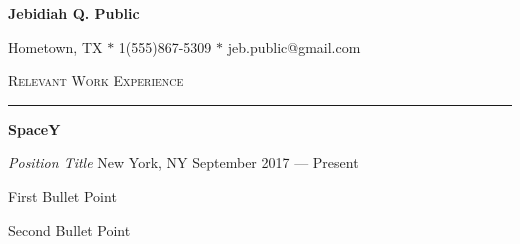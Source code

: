 \documentclass[letterpaper]{article}
\begin{document}

\begin{centering}

	{\huge\textbf{Jebidiah Q. Public}}

\vspace{8pt}

	Hometown, TX $\ast$ 1(555)867-5309 $\ast$ jeb.public@gmail.com

\vspace{8pt}

\end{centering}


\begin{centering}

	{\Large\scshape Relevant Work Experience\\[4pt]\hrule\vspace{4pt}}

\end{centering}


\vspace{4pt}

	{\large\textbf{SpaceY}} \par
	{\em Position Title}  New York, NY\hfill
	September 2017 --- Present\par

\begin{compactitem}

	\item First Bullet Point\par

	\item Second Bullet Point\par

\end{compactitem}



\vspace{6pt}
\end{document}
